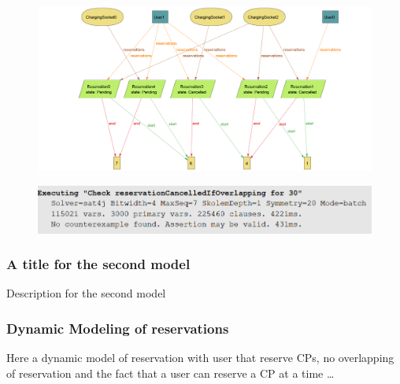 
\begin{figure}[H]
    \centering
    \includegraphics[width=1\textwidth]{src/alloy/reservationModel.png}
\end{figure}
\begin{figure}[H]
    \centering
    \includegraphics[width=1\textwidth]{src/alloy/reservationModel_assertion.png}
\end{figure}

\subsubsection{A title for the second model}
Description for the second model

\begin{figure}[H]
    \centering
\end{figure}

\subsubsection{Dynamic Modeling of reservations}
Here a dynamic model of reservation with user that reserve CPs, no overlapping of reservation and the fact that a user can reserve a CP at a time
\dots
